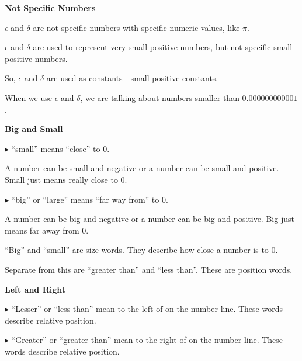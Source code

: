 \documentclass{ximera}
\begin{document}
\begin{warning} \textbf{\textcolor{red!80!black}{Not Specific Numbers}} 


$\epsilon$ and $\delta$ are not specific numbers with specific numeric values, like $\pi$. 


$\epsilon$ and $\delta$ are used to represent very small positive numbers, but not specific small positive numbers. 


So, $\epsilon$ and $\delta$ are used as constants - small positive constants.


When we use $\epsilon$ and $\delta$, we are talking about numbers smaller than $0.000000000001$. 


\end{warning}















\begin{idea} \textbf{\textcolor{blue!55!black}{Big and Small}} 

\textbf{\textcolor{blue!55!black}{$\blacktriangleright$}}  ``small'' means ``close'' to $0$. 


A number can be small and negative or a number can be small and positive. Small just means really close to $0$. 


\textbf{\textcolor{blue!55!black}{$\blacktriangleright$}}  ``big'' or ``large'' means ``far way from'' to $0$. 


A number can be big and negative or a number can be big and positive. Big just means far away from $0$. 


\end{idea}


``Big'' and ``small'' are size words.  They describe how close a number is to $0$. 

Separate from this are ``greater than'' and ``less than''.  These are position words. 





\newpage


\begin{idea} \textbf{\textcolor{blue!55!black}{Left and Right}} 


\textbf{\textcolor{blue!55!black}{$\blacktriangleright$}} ``Lesser'' or ``less than'' mean to the left of on the number line. These words describe relative position.


\textbf{\textcolor{blue!55!black}{$\blacktriangleright$}} ``Greater'' or ``greater than'' mean to the right of on the number line. These words describe relative position.




\end{idea}
\end{document}
